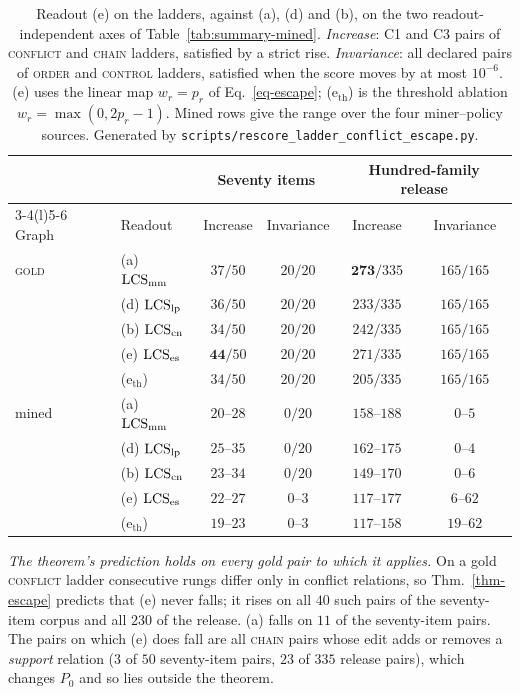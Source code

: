 \begin{table}[tbp]
\centering\small
\caption{Readout (e) on the ladders, against (a), (d) and (b), on the two readout-independent axes
  of Table~\ref{tab:summary-mined}. \emph{Increase}: C1 and C3 pairs of \textsc{conflict} and
  \textsc{chain} ladders, satisfied by a strict rise. \emph{Invariance}: all declared pairs of
  \textsc{order} and \textsc{control} ladders, satisfied when the score moves by at most $10^{-6}$.
  (e) uses the linear map $w_r=p_r$ of Eq.~\ref{eq-escape}; (e$_{\mathrm{th}}$) is the threshold
  ablation $w_r=\max(0,2p_r-1)$. Mined rows give the
  range over the four miner--policy sources. Generated by
  \texttt{scripts/rescore\_ladder\_conflict\_escape.py}.}
\label{tab:escape-ladder}
\setlength{\tabcolsep}{4pt}
\begin{tabular}{@{}llcccc@{}}
\toprule
& & \multicolumn{2}{c}{Seventy items} & \multicolumn{2}{c}{Hundred-family release} \\
\cmidrule(lr){3-4}\cmidrule(l){5-6}
Graph & Readout & Increase & Invariance & Increase & Invariance \\
\midrule
\textsc{gold} & (a) $\mathrm{LCS}_{\mathrm{mm}}$   & $37/50$ & $20/20$ & $\mathbf{273}/335$ & $165/165$ \\
              & (d) $\mathrm{LCS}_{\mathrm{lp}}$   & $36/50$ & $20/20$ & $233/335$ & $165/165$ \\
              & (b) $\mathrm{LCS}_{\mathrm{cn}}$ & $34/50$ & $20/20$ & $242/335$ & $165/165$ \\
              & (e) $\mathrm{LCS}_{\mathrm{es}}$     & $\mathbf{44}/50$ & $20/20$ & $271/335$ & $165/165$ \\
              & (e$_{\mathrm{th}}$)  & $34/50$ & $20/20$ & $205/335$ & $165/165$ \\
\midrule
mined & (a) $\mathrm{LCS}_{\mathrm{mm}}$   & $20$--$28$ & $0/20$ & $158$--$188$ & $0$--$5$ \\
      & (d) $\mathrm{LCS}_{\mathrm{lp}}$   & $25$--$35$ & $0/20$ & $162$--$175$ & $0$--$4$ \\
      & (b) $\mathrm{LCS}_{\mathrm{cn}}$ & $23$--$34$ & $0/20$ & $149$--$170$ & $0$--$6$ \\
      & (e) $\mathrm{LCS}_{\mathrm{es}}$     & $22$--$27$ & $0$--$3$ & $117$--$177$ & $6$--$62$ \\
      & (e$_{\mathrm{th}}$)  & $19$--$23$ & $0$--$3$ & $117$--$158$ & $19$--$62$ \\
\bottomrule
\end{tabular}
\end{table}

\emph{The theorem's prediction holds on every gold pair to which it applies.} On a gold
\textsc{conflict} ladder consecutive rungs differ only in conflict relations, so
Thm.~\ref{thm-escape} predicts that (e) never falls; it rises on all $40$ such
pairs of the seventy-item corpus and all $230$ of the release. (a) falls on $11$ of the seventy-item
pairs. The pairs on which (e) does fall are all \textsc{chain} pairs whose edit adds or removes a
\emph{support} relation ($3$ of $50$ seventy-item pairs, $23$ of $335$ release pairs), which changes
$P_0$ and so lies outside the theorem.

